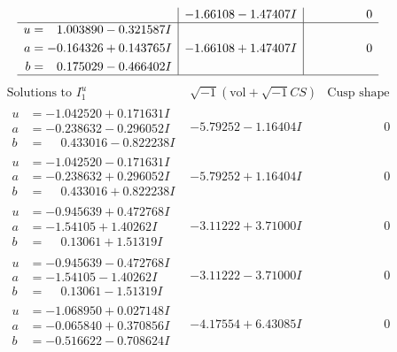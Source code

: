 \documentclass[1p]{elsarticle_modified}
\theoremstyle{definition}
\newcommand{\I}{\sqrt{-1}}
\begin{document}
$$\begin{array}{c|c|c}
 & -1.66108 - 1.47407 I & \phantom{-0.000000 } 0 \\ \hline\begin{aligned}
u &= \phantom{-}1.003890 - 0.321587 I \\
a &= -0.164326 + 0.143765 I \\
b &= \phantom{-}0.175029 - 0.466402 I\end{aligned}
 & -1.66108 + 1.47407 I & \phantom{-0.000000 } 0\\
 \hline 
 \end{array}$$\newpage$$\begin{array}{c|c|c}  
\text{Solutions to }I^u_{1}& \I (\text{vol} + \sqrt{-1}CS) & \text{Cusp shape}\\
 \hline 
\begin{aligned}
u &= -1.042520 + 0.171631 I \\
a &= -0.238632 - 0.296052 I \\
b &= \phantom{-}0.433016 - 0.822238 I\end{aligned}
 & -5.79252 - 1.16404 I & \phantom{-0.000000 } 0 \\ \hline\begin{aligned}
u &= -1.042520 - 0.171631 I \\
a &= -0.238632 + 0.296052 I \\
b &= \phantom{-}0.433016 + 0.822238 I\end{aligned}
 & -5.79252 + 1.16404 I & \phantom{-0.000000 } 0 \\ \hline\begin{aligned}
u &= -0.945639 + 0.472768 I \\
a &= -1.54105 + 1.40262 I \\
b &= \phantom{-}0.13061 + 1.51319 I\end{aligned}
 & -3.11222 + 3.71000 I & \phantom{-0.000000 } 0 \\ \hline\begin{aligned}
u &= -0.945639 - 0.472768 I \\
a &= -1.54105 - 1.40262 I \\
b &= \phantom{-}0.13061 - 1.51319 I\end{aligned}
 & -3.11222 - 3.71000 I & \phantom{-0.000000 } 0 \\ \hline\begin{aligned}
u &= -1.068950 + 0.027148 I \\
a &= -0.065840 + 0.370856 I \\
b &= -0.516622 - 0.708624 I\end{aligned}
 & -4.17554 + 6.43085 I & \phantom{-0.000000 } 0 \\ \hline\begin{aligned}

\end{aligned}
\end{array}$$
\end{document}
